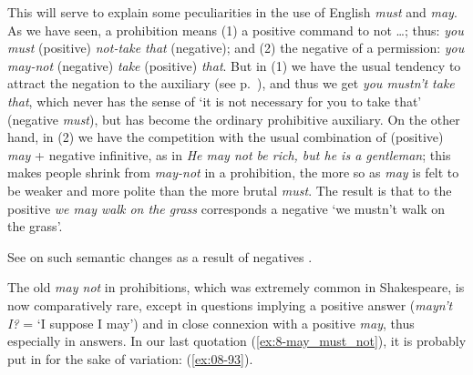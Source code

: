 \label{must-and-may} This will serve to explain some peculiarities in the use of English \textit{must} and \textit{may}. As we have seen, a prohibition means (1) a positive command to not {\dots}; thus: \textit{you must} (positive) \textit{not-take that} (negative); and (2) the negative of a permission: \textit{you may-not} (negative) \textit{take} (positive) \textit{that}. But in (1) we have the usual tendency to attract the negation to the auxiliary (see p.~\pageref{sec:neg-prefix}), and thus we get \textit{you mustn't take that}, which never has the sense of `it is not necessary for you to take that' (negative \textit{must}), but has become the ordinary prohibitive auxiliary. On the other hand, in (2) we have the competition with the usual combination of (positive) \textit{may} + negative infinitive, as in \textit{He may not be rich, but he is a gentleman}; this makes people shrink from \textit{may-not} in a prohibition, the more so as \textit{may} is felt to be weaker and more polite than the more brutal \textit{must}. The result is that to the positive \textit{we may walk on the grass} corresponds a negative `we mustn't walk on the grass'.

See on such semantic changes as a result of negatives 
\citet[38]{wellander1916ombetydelseutvecklingens}.

The old \textit{may not} in prohibitions, which was extremely common in Shakespeare, is now comparatively rare, except in questions implying a positive answer (\textit{mayn't I?} = `I suppose I may') and in close connexion with a positive \textit{may}, thus especially in answers. In our last quotation (\ref{ex:8-may_must_not}), it is probably put in for the sake of variation: (\ref{ex:08-93}). %

